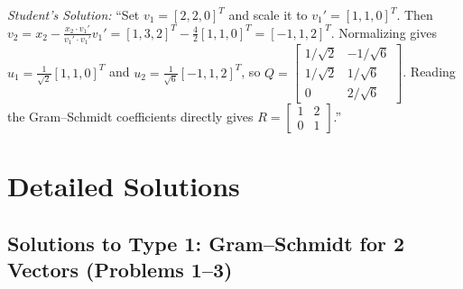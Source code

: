 \documentclass[11pt, letterpaper]{article}
\theoremstyle{definition}
\theoremstyle{remark}
\begin{document}
\begin{enumerate}[label=\textbf{Problem \arabic*.}, leftmargin=*, itemsep=0.9em]
    \emph{Student's Solution:} ``Set $v_1 = [2, 2, 0]^T$ and scale it to $v_1' = [1, 1, 0]^T$. Then $v_2 = x_2 - \frac{x_2 \cdot v_1'}{v_1' \cdot v_1'} v_1' = [1, 3, 2]^T - \frac{4}{2}[1, 1, 0]^T = [-1, 1, 2]^T$. Normalizing gives $u_1 = \frac{1}{\sqrt{2}}[1, 1, 0]^T$ and $u_2 = \frac{1}{\sqrt{6}}[-1, 1, 2]^T$, so $Q = \begin{bmatrix} 1/\sqrt{2} & -1/\sqrt{6} \\ 1/\sqrt{2} & 1/\sqrt{6} \\ 0 & 2/\sqrt{6} \end{bmatrix}$. Reading the Gram--Schmidt coefficients directly gives $R = \begin{bmatrix} 1 & 2 \\ 0 & 1 \end{bmatrix}$.''

\end{enumerate}

\newpage

\section{Detailed Solutions}

\subsection{Solutions to Type 1: Gram--Schmidt for 2 Vectors (Problems 1--3)}
\end{document}
